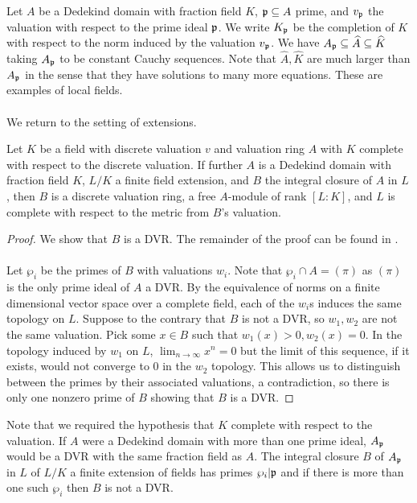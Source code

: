 Let $A$ be a Dedekind domain with fraction field $K$, $\mathfrak{p}\subseteq A$ prime, and $v_{\mathfrak{p}}$ the valuation with respect to the prime ideal $\mathfrak{p}$. We write $K_{\mathfrak{p}}$ be the completion of $K$ with respect to the norm induced by the valuation $v_{\mathfrak{p}}$. We have $A_{\mathfrak{p}}\subseteq\widehat{A}\subseteq\widehat{K}$ taking $A_{\mathfrak{p}}$ to be constant Cauchy sequences. Note that $\widehat{A},\widehat{K}$ are much larger than $A_{\mathfrak{p}}$ in the sense that they have solutions to many more equations. These are examples of local fields. \\\\
We return to the setting of extensions. 
\begin{proposition}
  Let $K$ be a field with discrete valuation $v$ and valuation ring $A$ with $K$ complete with respect to the discrete valuation. If further $A$ is a Dedekind domain with fraction field $K$, $L/K$ a finite field extension, and $B$ the integral closure of $A$ in $L$, then $B$ is a discrete valuation ring, a free $A$-module of rank $[L:K]$, and $L$ is complete with respect to the metric from $B$'s valuation. 
\end{proposition}
\begin{proof}
  We show that $B$ is a DVR. The remainder of the proof can be found in \cite[Ch. 2, \S 2, Proposition 3]{Serre}. \\\\
  Let $\wp_{i}$ be the primes of $B$ with valuations $w_{i}$. Note that $\wp_{i}\cap A=(\pi)$ as $(\pi)$ is the only prime ideal of $A$ a DVR. By the equivalence of norms on a finite dimensional vector space over a complete field, each of the $w_{i}$s induces the same topology on $L$. Suppose to the contrary that $B$ is not a DVR, so $w_{1},w_{2}$ are not the same valuation. Pick some $x\in B$ such that $w_{1}(x)>0, w_{2}(x)=0$. In the topology induced by $w_{1}$ on $L$, $\lim_{n\to\infty}x^{n}=0$ but the limit of this sequence, if it exists, would not converge to 0 in the $w_{2}$ topology. This allows us to distinguish between the primes by their associated valuations, a contradiction, so there is only one nonzero prime of $B$ showing that $B$ is a DVR. 
\end{proof}
\begin{remark}
  Note that we required the hypothesis that $K$ complete with respect to the valuation. If $A$ were a Dedekind domain with more than one prime ideal, $A_{\mathfrak{p}}$ would be a DVR with the same fraction field as $A$. The integral closure $B$ of $A_{\mathfrak{p}}$ in $L$ of $L/K$ a finite extension of fields has primes $\wp_{i}|\mathfrak{p}$ and if there is more than one such $\wp_{i}$ then $B$ is not a DVR. 
\end{remark}
